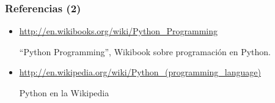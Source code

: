 \begin{frame}
\frametitle{Referencias (2)}

\begin{itemize}
\item \url{http://en.wikibooks.org/wiki/Python_Programming}

``Python Programming'', Wikibook sobre programación en Python.

\item \url{http://en.wikipedia.org/wiki/Python_(programming_language)}

Python en la Wikipedia

\end{itemize}

\end{frame}
